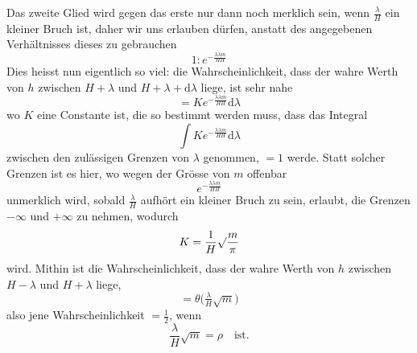 Das zweite Glied wird gegen das erste nur dann noch merklich sein, wenn \(\frac\lambda H\) ein kleiner Bruch ist, daher wir uns erlauben dürfen, anstatt des angegebenen Verhältnisses dieses zu gebrauchen
\[
1:e^{-\frac{\lambda\lambda m}{HH}}
\]
Dies heisst nun eigentlich so viel: die Wahrscheinlichkeit, dass der wahre Werth von \(h\) zwischen \(H+\lambda\) und \(H+\lambda+\mathrm{d}\lambda\) liege, ist sehr nahe
\[
=Ke^{-\frac{\lambda\lambda m}{HH}}\mathrm{d}\lambda
\]
wo \(K\) eine Constante ist, die so bestimmt werden muss, dass das Integral
\[
\int Ke^{-\frac{\lambda\lambda m}{HH}}\mathrm{d}\lambda
\]
zwischen den zulässigen Grenzen von \(\lambda\) genommen, \(=1\) werde. Statt solcher Grenzen ist es hier, wo wegen der Grösse von \(m\) offenbar
\[
e^{-\frac{\lambda\lambda m}{HH}}
\]
unmerklich wird, sobald \(\frac\lambda H\) aufhört ein kleiner Bruch zu sein, erlaubt, die Grenzen \(-\infty\) und \(+\infty\) zu nehmen, wodurch
\[
K=\frac1H\surd\frac m\pi
\]
wird. Mithin ist die Wahrscheinlichkeit, dass der wahre Werth von \(h\) zwischen \(H-\lambda\) und \(H+\lambda\) liege,
\[
=\theta\bigl(\tfrac\lambda H\surd m\bigr)
\]
also jene Wahrscheinlichkeit \(=\frac12\), wenn
\[
\frac\lambda H\surd m=\rho\quad\text{ist.}
\]

